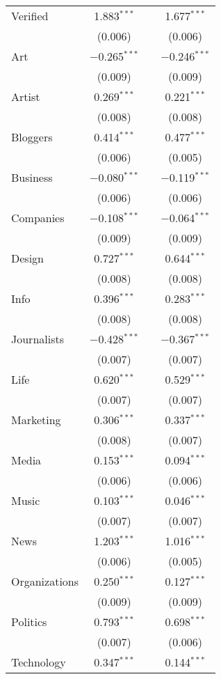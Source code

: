 \begin{table}[!htbp]
\begin{tabular}{@{\extracolsep{5pt}}lccc}
  Verified & 1.883$^{***}$ &  & 1.677$^{***}$ \\ 
  & (0.006) &  & (0.006) \\ 
  Art & $-$0.265$^{***}$ &  & $-$0.246$^{***}$ \\ 
  & (0.009) &  & (0.009) \\ 
  Artist & 0.269$^{***}$ &  & 0.221$^{***}$ \\ 
  & (0.008) &  & (0.008) \\ 
  Bloggers & 0.414$^{***}$ &  & 0.477$^{***}$ \\ 
  & (0.006) &  & (0.005) \\ 
  Business & $-$0.080$^{***}$ &  & $-$0.119$^{***}$ \\ 
  & (0.006) &  & (0.006) \\ 
  Companies & $-$0.108$^{***}$ &  & $-$0.064$^{***}$ \\ 
  & (0.009) &  & (0.009) \\ 
  Design & 0.727$^{***}$ &  & 0.644$^{***}$ \\ 
  & (0.008) &  & (0.008) \\ 
  Info & 0.396$^{***}$ &  & 0.283$^{***}$ \\ 
  & (0.008) &  & (0.008) \\ 
  Journalists & $-$0.428$^{***}$ &  & $-$0.367$^{***}$ \\ 
  & (0.007) &  & (0.007) \\ 
  Life & 0.620$^{***}$ &  & 0.529$^{***}$ \\ 
  & (0.007) &  & (0.007) \\ 
  Marketing & 0.306$^{***}$ &  & 0.337$^{***}$ \\ 
  & (0.008) &  & (0.007) \\ 
  Media & 0.153$^{***}$ &  & 0.094$^{***}$ \\ 
  & (0.006) &  & (0.006) \\ 
  Music & 0.103$^{***}$ &  & 0.046$^{***}$ \\ 
  & (0.007) &  & (0.007) \\ 
  News & 1.203$^{***}$ &  & 1.016$^{***}$ \\ 
  & (0.006) &  & (0.005) \\ 
  Organizations & 0.250$^{***}$ &  & 0.127$^{***}$ \\ 
  & (0.009) &  & (0.009) \\ 
  Politics & 0.793$^{***}$ &  & 0.698$^{***}$ \\ 
  & (0.007) &  & (0.006) \\ 
  Technology & 0.347$^{***}$ &  & 0.144$^{***}$ \\ 

\end{tabular}
\end{table}
